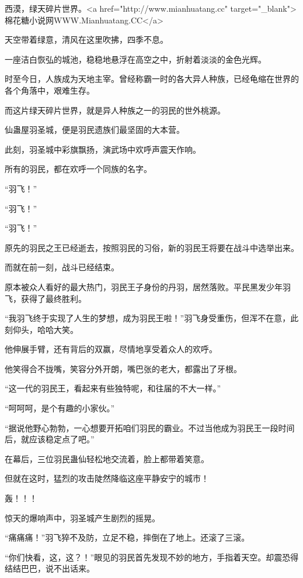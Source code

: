 
\begin{this_body}

西漠，绿天碎片世界。<a href="http://www.mianhuatang.cc" target="\_blank">棉花糖小说网WWW.Mianhuatang.CC</a>

天空带着绿意，清风在这里吹拂，四季不息。

一座洁白恢弘的城池，稳稳地悬浮在高空之中，折射着淡淡的金色光辉。

时至今日，人族成为天地主宰。曾经称霸一时的各大异人种族，已经龟缩在世界的各个角落中，艰难生存。

而这片绿天碎片世界，就是异人种族之一的羽民的世外桃源。

仙蛊屋羽圣城，便是羽民遗族们最坚固的大本营。

此刻，羽圣城中彩旗飘扬，演武场中欢呼声震天作响。

所有的羽民，都在欢呼一个同族的名字。

“羽飞！”

“羽飞！”

“羽飞！”

原先的羽民之王已经逝去，按照羽民的习俗，新的羽民王将要在战斗中选举出来。

而就在前一刻，战斗已经结束。

原本被众人看好的最大热门，羽民王子身份的丹羽，居然落败。平民黑发少年羽飞，获得了最终胜利。

“我羽飞终于实现了人生的梦想，成为羽民王啦！”羽飞身受重伤，但浑不在意，此刻仰头，哈哈大笑。

他伸展手臂，还有背后的双赢，尽情地享受着众人的欢呼。

他笑得合不拢嘴，笑容分外开朗，嘴巴张的老大，都露出了牙根。

“这一代的羽民王，看起来有些独特呢，和往届的不大一样。”

“呵呵呵，是个有趣的小家伙。”

“据说他野心勃勃，一心想要开拓咱们羽民的霸业。不过当他成为羽民王一段时间后，就应该稳定点了吧。”

在幕后，三位羽民蛊仙轻松地交流着，脸上都带着笑意。

但就在这时，猛烈的攻击陡然降临这座平静安宁的城市！

轰！！！

惊天的爆响声中，羽圣城产生剧烈的摇晃。

“痛痛痛！”羽飞猝不及防，立足不稳，摔倒在了地上。还滚了三滚。

“你们快看，这，这？！”眼见的羽民首先发现不妙的地方，手指着天空。却震恐得结结巴巴，说不出话来。


\end{this_body}
